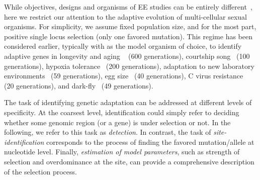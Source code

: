 While objectives, designs and organisms of EE studies can be entirely
different~\cite{Barrick2013Genome,schlotterer2015combining}, here we
restrict our attention to the adaptive evolution of multi-cellular
sexual organisms.  For simplicity, we assume fixed population size,
and for the most part, positive single locus selection (only one
favored mutation). This regime has been considered earlier, typically
with \dmel as the model organism of choice, to identify adaptive genes
in longevity and aging ~\cite{burke2010genome,remolina2012genomic}
(600 generations), courtship song~\cite{turner2011population} (100
generations), hypoxia tolerance~\cite{zhou2011experimental} (200
generations), adaptation to new laboratory
environments~\cite{orozco2012adaptation,tobler2014massive} (59
generations), egg size~\cite{jha2015whole} (40 generations), C virus
resistance~\cite{martins2014host} (20 generations), and
dark-fly~\cite{izutsu2015dynamics} (49 generations).


The task of identifying genetic adaptation can be addressed at
different levels of specificity. At the coarsest level, identification
could simply refer to deciding whether some genomic region (or a gene)
is under selection or not. In the following, we refer to this task as
\emph{detection}. In contrast, the task of \emph{site-identification}
corresponds to the process of finding the favored mutation/allele at
nucleotide level. Finally, \emph{estimation of model parameters}, such
as strength of selection and overdominance at the site, can provide a
comprehensive description of the selection process.

